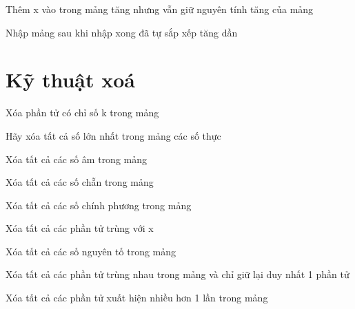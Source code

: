 \begin{problem}
    Thêm x vào trong mảng tăng nhưng vẫn giữ nguyên tính tăng của mảng
\end{problem}

\begin{problem}
    Nhập mảng sau khi nhập xong đã tự sắp xếp tăng dần
\end{problem}

\section{Kỹ thuật xoá} 
\begin{problem}
    Xóa phần tử có chỉ số k trong mảng
\end{problem}
\begin{problem}
    Hãy xóa tất cả số lớn nhất trong mảng các số thực
\end{problem}
\begin{problem}
    Xóa tất cả các số âm trong mảng
\end{problem}
\begin{problem}
    Xóa tất cả các số chẵn trong mảng
\end{problem}
\begin{problem}
    Xóa tất cả các số chính phương trong mảng
\end{problem}
\begin{problem}
    Xóa tất cả các phần tử trùng với x
\end{problem}
\begin{problem}
    Xóa tất cả các số nguyên tố trong mảng
\end{problem}
\begin{problem}
    Xóa tất cả các phần tử trùng nhau trong mảng và chỉ giữ lại duy nhất 1 phần tử
\end{problem}
\begin{problem}
    Xóa tất cả các phần tử xuất hiện nhiều hơn 1 lần trong mảng
\end{problem}


